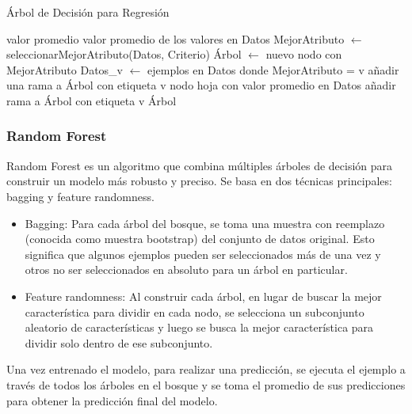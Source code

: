 \documentclass[12pt]{article}
\begin{document}
\begin{algorithm}
\caption{Árbol de Decisión para Regresión}
\begin{algorithmic}
        \State \Return valor promedio
    \EndIf
        \State \Return valor promedio de los valores en Datos
    \EndIf
    \State MejorAtributo $\leftarrow$ seleccionarMejorAtributo(Datos, Criterio)
    \State Árbol $\leftarrow$ nuevo nodo con MejorAtributo
        \State Datos\_v $\leftarrow$ ejemplos en Datos donde MejorAtributo = v
            \State añadir una rama a Árbol con etiqueta v
            \State nodo hoja con valor promedio en Datos
        \Else
            \State añadir rama a Árbol con etiqueta v
            \State {}
        \EndIf
    \EndFor
    \Return Árbol
\EndProcedure
\end{algorithmic}
\end{algorithm}



\subsubsection{Random Forest}

Random Forest es un algoritmo que combina múltiples árboles de decisión para construir un modelo más robusto y preciso. Se basa en dos técnicas principales: bagging y feature randomness.

\begin{itemize}
  \item Bagging: Para cada árbol del bosque, se toma una muestra con reemplazo (conocida como muestra bootstrap) del conjunto de datos original. Esto significa que algunos ejemplos pueden ser seleccionados más de una vez y otros no ser seleccionados en absoluto para un árbol en particular.
  \item Feature randomness: Al construir cada árbol, en lugar de buscar la mejor característica para dividir en cada nodo, se selecciona un subconjunto aleatorio de características y luego se busca la mejor característica para dividir solo dentro de ese subconjunto.
\end{itemize}

Una vez entrenado el modelo, para realizar una predicción, se ejecuta el ejemplo a través de todos los árboles en el bosque y se toma el promedio de sus predicciones para obtener la predicción final del modelo.
\end{document}
